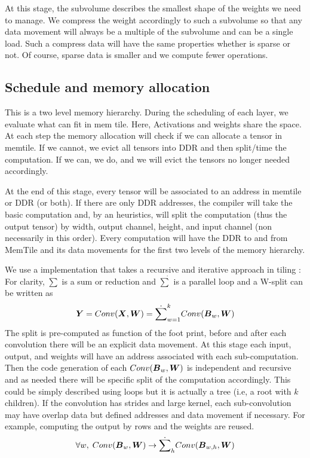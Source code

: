 \documentclass[conference]{IEEEtran}
\begin{document}
At this stage, the subvolume describes the smallest shape of the
weights we need to manage. We compress the weight accordingly to such
a subvolume so that any data movement will always be a multiple of the
subvolume and can be a single load. Such a compress data will have the
same properties whether is sparse or not. Of course, sparse data is
smaller and we compute fewer operations.


\subsection{Schedule and memory allocation}
This is a two level memory hierarchy. During the scheduling of each
layer, we evaluate what can fit in mem tile. Here, Activations and
weights share the space. At each step the memory allocation will check
if we can allocate a tensor in memtile. If we cannot, we evict all
tensors into DDR and then split/time the computation. If we can, we
do, and we will evict the tensors no longer needed accordingly.

At the end of this stage, every tensor will be associated to an
address in memtile or DDR (or both). If there are only DDR addresses,
the compiler will take the basic computation and, by an heuristics,
will split the computation (thus the output tensor) by width, output
channel, height, and input channel (non necessarily in this
order). Every computation will have the DDR to and from MemTile and
its data movements for the first two levels of the memory hierarchy.

We use a implementation that takes a recursive and iterative approach
in tiling \cite{abs-2110-04327}: For clarity, $\sum$ is a sum or
reduction and $\dot{\sum}$ is a parallel loop and a W-split can be
written as
\begin{equation}
  {\boldsymbol Y} =  Conv({\boldsymbol X},{\boldsymbol W}) = \dot{\sum}_{w=1}^k
  Conv({\boldsymbol B}_w,{\boldsymbol W})
\end{equation}
The split is pre-computed as function of the foot print, before and
after each convolution there will be an explicit data movement. At
this stage each input, output, and weights will have an address
associated with each sub-computation. Then the code generation of each
$Conv({\boldsymbol B}_w,{\boldsymbol W})$ is independent and recursive and as needed
there will be specific split of the computation accordingly. This
could be simply described using loops but it is actually a tree (i.e,
a root with $k$ children). If the convolution has strides and large
kernel, each sub-convolution may have overlap data but defined
addresses and data movement if necessary. For example, computing the
output by rows and the weights are reused.
\begin{equation}
  \forall w, \;   Conv({\boldsymbol B}_w,{\boldsymbol W}) \rightarrow  \dot{\sum}_h Conv({\boldsymbol B}_{w,h},{\boldsymbol W})
\end{equation}
\end{document}
